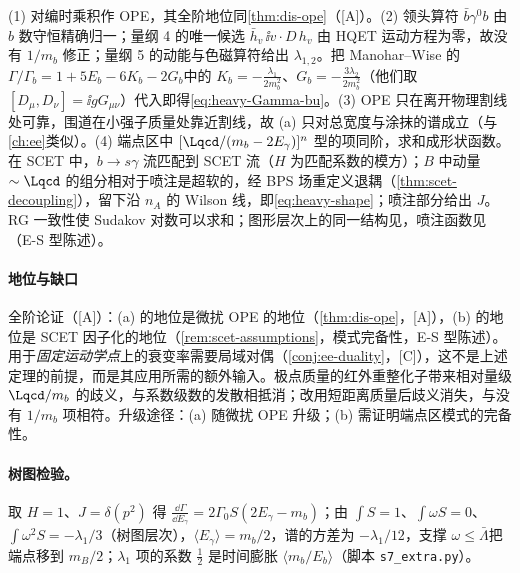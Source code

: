 \begin{proofsketch}
(1) 对编时乘积作 OPE，其全阶地位同\cref{thm:dis-ope}（[A]）。(2) 领头算符 $\bar b\gamma^0b$ 由 $b$ 数守恒精确归一；量纲 4 的唯一候选 $\bar h_v\,\ii v\cdot D\,h_v$ 由 HQET 运动方程为零，故没有 $1/m_b$ 修正\cite{ChayGeorgiGrinstein1990,BigiUraltsevVainshtein1992}；量纲 5 的动能与色磁算符给出 $\lambda_{1,2}$。把 Manohar--Wise 的 $\Gamma/\Gamma_b=1+5E_b-6K_b-2G_b$\cite[式~(5.7)，$\rho\to0$]{ManoharWise1994}中的 $K_b=-\frac{\lambda_1}{2m_b^2}$、$G_b=-\frac{3\lambda_2}{2m_b^2}$（他们取 $[D_\mu,D_\nu]=\ii gG_{\mu\nu}$）代入即得\cref{eq:heavy-Gamma-bu}。(3) OPE 只在离开物理割线处可靠，围道在小强子质量处靠近割线，故 (a) 只对总宽度与涂抹的谱成立（与\cref{ch:ee}类似）。(4) 端点区中 $[\Lqcd/(m_b-2E_\gamma)]^n$ 型的项同阶，求和成形状函数\cite{Neubert1994a,Neubert1994b,BigiEtAl1994}。在 SCET 中，$b\to s\gamma$ 流匹配到 SCET 流（$H$ 为匹配系数的模方）；$B$ 中动量 $\sim\Lqcd$ 的组分相对于喷注是超软的，经 BPS 场重定义退耦（\cref{thm:scet-decoupling}），留下沿 $n_A$ 的 Wilson 线，即\cref{eq:heavy-shape}；喷注部分给出 $J$。RG 一致性使 Sudakov 对数可以求和\cite{BauerFlemingLuke2000}；图形层次上的同一结构见\cite{KorchemskySterman1994}，喷注函数见\cite{Bauer:2003pi,Becher:2006qw}（E-S 型陈述）。
\end{proofsketch}

\paragraph{地位与缺口}
全阶论证（[A]）：(a) 的地位是微扰 OPE 的地位（\cref{thm:dis-ope}，[A]），(b) 的地位是 SCET 因子化的地位（\cref{rem:scet-assumptions}，模式完备性，E-S 型陈述）。用于\emph{固定运动学点}上的衰变率需要局域对偶（\cref{conj:ee-duality}，[C]），这不是上述定理的前提，而是其应用所需的额外输入。极点质量的红外重整化子带来相对量级 $\Lqcd/m_b$ 的歧义，与系数级数的发散相抵消；改用短距离质量后歧义消失，与没有 $1/m_b$ 项相符\cite{Bigi:1994em,Beneke:1994sw}。升级途径：(a) 随微扰 OPE 升级；(b) 需证明端点区模式的完备性。

\paragraph{树图检验。}
取 $H=1$、$J=\delta(p^2)$ 得 $\frac{\dd\Gamma}{\dd E_\gamma}=2\Gamma_0S(2E_\gamma-m_b)$；由 $\int S=1$、$\int\omega S=0$、$\int\omega^2S=-\lambda_1/3$（树图层次），$\langle E_\gamma\rangle=m_b/2$，谱的方差为 $-\lambda_1/12$，支撑 $\omega\le\bar\Lambda$\cite{Neubert1994b}把端点移到 $m_B/2$；$\lambda_1$ 项的系数 $\frac12$ 是时间膨胀 $\langle m_b/E_b\rangle$（脚本 \texttt{s7\_\allowbreak extra.py}）。

